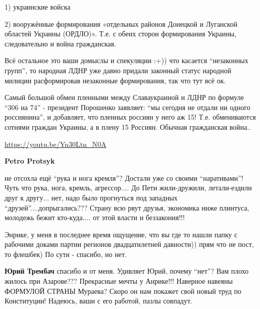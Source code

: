 \begin{itemize}
\begin{itemize}
1) украинские войска

2) вооружённые формирования «отдельных районов Донецкой и Луганской областей
Украины (ОРДЛО)». Т.е. с обеих сторон формирования Украины, следовательно и
война гражданская.

Всё остальное это ваши домыслы и спекуляции :+)) что касается
\enquote{незаконных групп}, то народная ЛДНР уже давно придали законный статус
народной милиции расформировав незаконные формирования, так что тут всё ок.


Самый большой обмен пленными между Славаукраиной и ЛДНР по формуле \enquote{306 на 74}
- президент Порошенко заявляет: \enquote{мы сегодня не отдали ни одного россиянина}, и
добавляет, что пленных россиян у него аж 15! Т.е. обмениваются сотнями граждан
Украины, а в плену 15 Россиян. Обычная гражданская война..

\url{https://youtu.be/Yn30Ltn_N0A}

\textbf{Petro Protsyk} 

не отсохла ещё \enquote{рука и нога кремля}? Достали уже со своими \enquote{наративами}! Чуть
что рука, нога, кремль, агрессор.... До Пети жили-дружили, летали-ездили друг к
другу... нет, надо было прогнуться под западных \enquote{друзей}....допрыгались??? Страну
всю рвут друзья, экономика ниже плинтуса, молодежь бежит кто-куда.... от этой
власти и беззакония!!!

\end{itemize} %


Энрике, у меня в последнее время ощущение, что вы где то нашли папку с рабочими
доками партии регионов двадцатилетней давности)) прям что не пост, то флешбек)
По сути - спасибо, но нет.

\begin{itemize} %
\textbf{Юрий Трембач} спасибо и от меня. Удивляет Юрий, почему \enquote{нет}? Вам плохо жилось при Азарове???
Прекрасные мечты у Анрике!!! Наверное навеяны ФОРМУЛОЙ СТРАНЫ Мураева?
Скоро он нам покажет свой новый труд по Конституции!
Надеюсь, ваши с его работой, пазлы совпадут.
\end{itemize} %

\end{itemize} %
